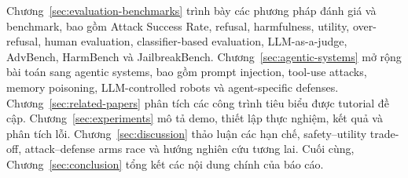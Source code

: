 Chương~\ref{sec:evaluation-benchmarks} trình bày các phương pháp đánh giá
và benchmark, bao gồm Attack Success Rate, refusal, harmfulness, utility,
over-refusal, human evaluation, classifier-based evaluation,
LLM-as-a-judge, AdvBench, HarmBench và JailbreakBench. Chương~\ref{sec:agentic-systems}
mở rộng bài toán sang agentic systems, bao gồm prompt injection, tool-use
attacks, memory poisoning, LLM-controlled robots và agent-specific defenses.
Chương~\ref{sec:related-papers} phân tích các công trình tiêu biểu được
tutorial đề cập. Chương~\ref{sec:experiments} mô tả demo, thiết lập thực
nghiệm, kết quả và phân tích lỗi. Chương~\ref{sec:discussion} thảo luận
các hạn chế, safety--utility trade-off, attack--defense arms race và hướng
nghiên cứu tương lai. Cuối cùng, Chương~\ref{sec:conclusion} tổng kết các
nội dung chính của báo cáo.